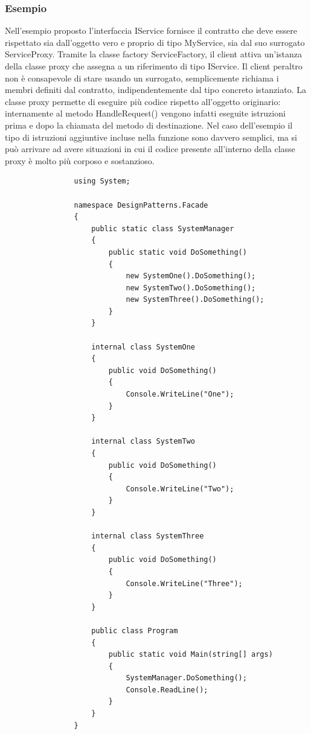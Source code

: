 \documentclass[a4paper,10pt]{article}
\begin{document}
        \newpage
        \subsubsection{Esempio}

Nell’esempio proposto l’interfaccia IService fornisce il contratto che deve essere rispettato sia dall’oggetto vero e proprio di tipo MyService, sia dal suo surrogato ServiceProxy. Tramite la classe factory ServiceFactory, il client attiva un’istanza della classe proxy che assegna a un riferimento di tipo IService. Il client peraltro non è consapevole di stare usando un surrogato, semplicemente richiama i membri definiti dal contratto, indipendentemente dal tipo concreto istanziato. La classe proxy permette di eseguire più codice rispetto all’oggetto originario: internamente al metodo HandleRequest() vengono infatti eseguite istruzioni prima e dopo la chiamata del metodo di destinazione. Nel caso dell’esempio il tipo di istruzioni aggiuntive incluse nella funzione sono davvero semplici, ma si può arrivare ad avere situazioni in cui il codice presente all’interno della classe proxy è molto più corposo e sostanzioso.
    
            \begin{lstlisting}
                using System;

                namespace DesignPatterns.Facade
                {
                    public static class SystemManager
                    {
                        public static void DoSomething()
                        {
                            new SystemOne().DoSomething();
                            new SystemTwo().DoSomething();
                            new SystemThree().DoSomething();
                        }
                    }
                
                    internal class SystemOne
                    {
                        public void DoSomething()
                        {
                            Console.WriteLine("One");
                        }
                    }
                
                    internal class SystemTwo
                    {
                        public void DoSomething()
                        {
                            Console.WriteLine("Two");
                        }
                    }
                
                    internal class SystemThree
                    {
                        public void DoSomething()
                        {
                            Console.WriteLine("Three");
                        }
                    }
                
                    public class Program
                    {
                        public static void Main(string[] args)
                        {
                            SystemManager.DoSomething();
                            Console.ReadLine();
                        }
                    }
                }
            \end{lstlisting}
\end{document}
